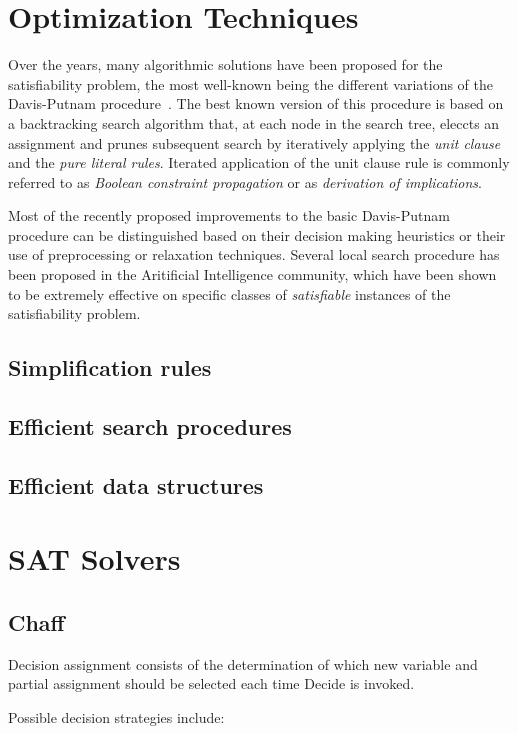\section{Optimization Techniques}
Over the years, many algorithmic solutions have been proposed for the
satisfiability problem, the most well-known being the different variations
of the Davis-Putnam procedure~\cite{DP60}.
The best known version of this procedure is based on a backtracking search
algorithm that, at each node in the search tree, eleccts an assignment and
prunes subsequent search by iteratively applying the {\em unit clause\/} and
the {\em pure literal rules\/}. Iterated application of the unit clause rule
is commonly referred to as {\em Boolean constraint propagation\/} or as {\em
derivation of implications\/}.


Most of the recently proposed improvements to the basic Davis-Putnam procedure
can be distinguished based on their decision making heuristics or their use of
preprocessing or relaxation techniques. 
Several local search procedure has been proposed in the Aritificial
Intelligence community, which have been shown to be extremely effective on
specific classes of {\em satisfiable\/} instances of the satisfiability
problem. 


\subsection{Simplification rules}
\subsection{Efficient search procedures}
\subsection{Efficient data structures}

\section{SAT Solvers}
\subsection{Chaff}

Decision assignment consists of the determination of which new variable and
partial assignment should be selected each time {\sc  Decide} is invoked.

Possible decision strategies include:
\bit
\w 
\eit


